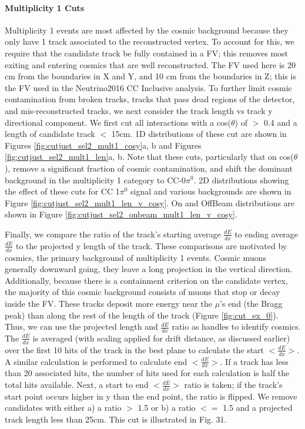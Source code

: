 \documentclass{article}
\begin{document}
\paragraph{Multiplicity 1 Cuts}
Multiplicity 1 events are most affected by the cosmic background because they only have 1 track associated to the reconstructed vertex. To account for this, we require that the candidate track be fully contained in a FV; this removes most exiting and entering cosmics that are well reconstructed. The FV used here is 20 cm from the boundaries in X and Y, and 10 cm from the boundaries in Z; this is the FV used in the Neutrino2016 CC Inclusive analysis. To further limit cosmic contamination from broken tracks, tracks that pass dead regions of the detector, and mis-reconstructed tracks, we next consider the track length vs track y directional component. We first cut all interactions with a cos($\theta$) of $>$ 0.4 and a length of candidate track $<$ 15cm. 1D distributions of these cut are shown in Figures \ref{fig:cutjust_sel2_mult1_cosy}a, b and Figures \ref{fig:cutjust_sel2_mult1_len}a, b. Note that these cuts, particularly that on cos($\theta$), remove a significant fraction of cosmic contamination, and shift the dominant background in the multiplicity 1 category to CC-0$\pi^0$. 2D distributions showing the effect of these cuts for CC 1$\pi^0$ signal and various backgrounds are shown in Figure \ref{fig:cutjust_sel2_mult1_len_v_cosy}. On and OffBeam distributions are shown in Figure \ref{fig:cutjust_sel2_onbeam_mult1_len_v_cosy}. 

\par Finally, we compare the ratio of the track's starting average $\frac{dE}{dx}$ to ending average $\frac{dE}{dx}$ to the projected y length of the track. These comparisons are motivated by cosmics, the primary background of multiplicity 1 events. Cosmic muons generally downward going, they leave a long projection in the vertical direction. Additionally, because there is a containment criterion on the candidate vertex, the majority of this cosmic background consists of muons that stop or decay inside the FV. These tracks deposit more energy near the $\mu$'s end (the Bragg peak) than along the rest of the length of the track (Figure \ref{fig:cut_ex_0}). Thus, we can use the projected length and $\frac{dE}{dx}$ ratio as handles to identify cosmics. The $\frac{dE}{dx}$ is averaged (with scaling applied for drift distance, as discussed earlier) over the first 10 hits of the track in the best plane to calculate the start $<\frac{dE}{dx}>$. A similar calculation is performed to calculate end $<\frac{dE}{dx}>$.  If a track has less than 20 associated hits, the number of hits used for each calculation is half the total hits available.  Next, a start to end $<\frac{dE}{dx}>$ ratio is taken; if the track's start point occurs higher in y than the end point, the ratio is flipped. We remove candidates with either a) a ratio $>$ 1.5 or b) a ratio $<=$ 1.5 and a projected track length less than 25cm.  This cut is illustrated in Fig. 31.
\end{document}
